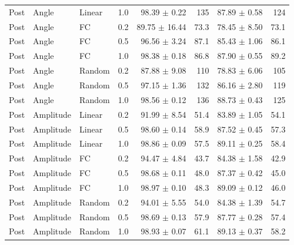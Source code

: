 \begin{table}[!t]
\begin{tabular}{llllrrrr}
Post & Angle & Linear & 1.0 & 98.39 $\pm$ 0.22 & 135 & 87.89 $\pm$ 0.58 & 124 \\
Post & Angle & FC & 0.2 & 89.75 $\pm$ 16.44 & 73.3 & 78.45 $\pm$ 8.50 & 73.1 \\
Post & Angle & FC & 0.5 & 96.56 $\pm$ 3.24 & 87.1 & 85.43 $\pm$ 1.06 & 86.1 \\
Post & Angle & FC & 1.0 & 98.38 $\pm$ 0.18 & 86.8 & 87.90 $\pm$ 0.55 & 89.2 \\
Post & Angle & Random & 0.2 & 87.88 $\pm$ 9.08 & 110 & 78.83 $\pm$ 6.06 & 105 \\
Post & Angle & Random & 0.5 & 97.15 $\pm$ 1.36 & 132 & 86.16 $\pm$ 2.80 & 119 \\
Post & Angle & Random & 1.0 & 98.56 $\pm$ 0.12 & 136 & 88.73 $\pm$ 0.43 & 125 \\
\midrule
Post & Amplitude & Linear & 0.2 & 91.99 $\pm$ 8.54 & 51.4 & 83.89 $\pm$ 1.05 & 54.1 \\
Post & Amplitude & Linear & 0.5 & 98.60 $\pm$ 0.14 & 58.9 & 87.52 $\pm$ 0.45 & 57.3 \\
Post & Amplitude & Linear & 1.0 & 98.86 $\pm$ 0.09 & 57.5 & 89.11 $\pm$ 0.25 & 58.4 \\
Post & Amplitude & FC & 0.2 & 94.47 $\pm$ 4.84 & 43.7 & 84.38 $\pm$ 1.58 & 42.9 \\
Post & Amplitude & FC & 0.5 & 98.68 $\pm$ 0.11 & 48.0 & 87.37 $\pm$ 0.42 & 45.0 \\
Post & Amplitude & FC & 1.0 & 98.97 $\pm$ 0.10 & 48.3 & 89.09 $\pm$ 0.12 & 46.0 \\
Post & Amplitude & Random & 0.2 & 94.01 $\pm$ 5.55 & 54.0 & 84.38 $\pm$ 1.39 & 54.7 \\
Post & Amplitude & Random & 0.5 & 98.69 $\pm$ 0.13 & 57.9 & 87.77 $\pm$ 0.28 & 57.4 \\
Post & Amplitude & Random & 1.0 & 98.93 $\pm$ 0.07 & 61.1 & 89.13 $\pm$ 0.37 & 58.2 \\
\bottomrule
\end{tabular}
\end{table}
